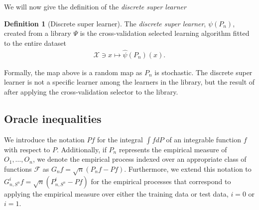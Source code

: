 \documentclass[11pt, a4paper]{article}
\theoremstyle{definition}
\newtheorem{definition}[theorem]{Definition}
\theoremstyle{remark}
\newcommand{\la}{\psi}
\newcommand{\Sn}{S^n}
\newcommand{\lib}{\Psi}
\begin{document}
We will now give the definition of the \textit{discrete super learner}  
\begin{definition}[Discrete super learner]
    The \textit{discrete super learner}, $ \la(P_n) $, created from a library $ \lib $ is the cross-validation selected learning algorithm fitted to the entire dataset 
    \begin{align*}
        \mathcal{X} \ni x \mapsto \hat{\la}(P_n)(x). 
    \end{align*}
\end{definition}
Formally, the map above is a random map as $ P_n $ is stochastic. The discrete super learner is not a specific learner among the learners in the library, but the result of after applying the cross-validation selector to the library. 

\subsection{Oracle inequalities}
We introduce the notation $Pf$ for the integral $\int f dP$ of an integrable function $f$ with respect to $P$. Additionally, if $P_n$ represents the empirical measure of $O_1, \dots, O_n$, we denote the empirical process indexed over an appropriate class of functions $\mathcal{F}$ as $G_n f = \sqrt{n}(P_n f - P f)$. Furthermore, we extend this notation to $G_{n, \Sn}^{i} f = \sqrt{n}(P_{n, \Sn}^{i} - Pf)$ for the empirical processes that correspond to applying the empirical measure over either the training data or test data, $ i = 0 $ or $ i = 1 $.
\end{document}
